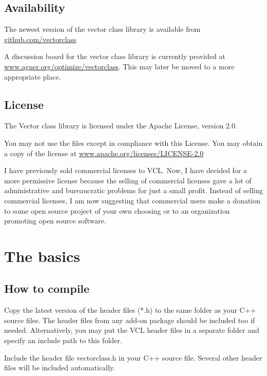 \documentclass[vcl_manual.tex]{subfiles}
\begin{document}
\section{Availability} \label{Availability}
The newest version of the vector class library is available from 
\href{https://github.com/vectorclass}{github.com/vectorclass}

A discussion board for the vector class library is currently provided at
\href{https://www.agner.org/optimize/vectorclass/}{www.agner.org/optimize/vectorclass}. 
This may later be moved to a more appropriate place.


\section{License} \label{License}
The Vector class library is licensed under the Apache License, version 2.0.

You may not use the files except in compliance with this License.
You may obtain a copy of the license at
\href{https://www.apache.org/licenses/LICENSE-2.0}{www.apache.org/licenses/LICENSE-2.0}

I have previously sold commercial licenses to VCL. Now, I have decided for a more permissive license because the selling of commercial licenses gave a lot of administrative and bureaucratic problems for just a small profit. Instead of selling commercial licenses, I am now suggesting that commercial users make a donation to some open source project of your own choosing or to an organization promoting open source software.


\chapter{The basics}\label{chap:TheBasics}
\section{How to compile} \label{HowToCompile}

Copy the latest version of the header files (*.h) to the same folder as your C++ source files. The header files from any add-on package should be included too if needed. Alternatively, you may put the VCL header files in a separate folder and specify an include path to this folder.

Include the header file vectorclass.h in your C++ source file.
Several other header files will be included automatically.
\end{document}
